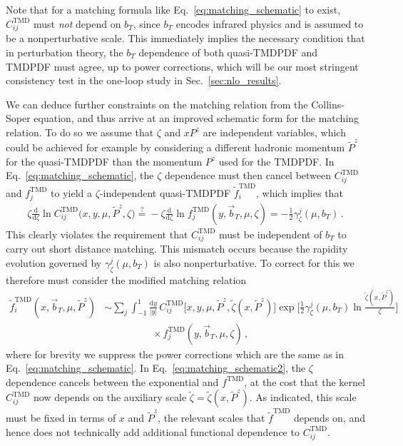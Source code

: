 \documentclass[11pt,a4paper]{article}
\DeclareRobustCommand{\eq}[1]{Eq.~\eqref{eq:#1}}
\DeclareRobustCommand{\sec}[1]{Sec.~\ref{sec:#1}}
\newcommand{\df}{\mathrm{d}}
\newcommand{\nn}{\nonumber}
\newcommand\TMD{\mathrm{TMD}}
\newcommand{\bt}{\vec b_T}
\begin{document}
Note that for a matching formula like \eq{matching_schematic} to exist, $C^\TMD_{ij}$ must \emph{not} depend on $b_T$, since $b_T$ encodes infrared physics and is assumed to be a nonperturbative scale.
This immediately implies the necessary condition that in perturbation theory,
the $b_T$ dependence of both quasi-TMDPDF and TMDPDF must agree, up to power corrections,
which will be our most stringent consistency test in the one-loop study in \sec{nlo_results}.

We can deduce further constraints on the matching relation from the Collins-Soper equation, and thus arrive at an improved schematic form for the matching relation. To do so we assume that $\zeta$ and $x P^z$ are independent variables, which could be achieved for example by considering a different hadronic momentum $\tilde P^z$ for the quasi-TMDPDF than the momentum $P^z$ used for the  TMDPDF.
In \eq{matching_schematic}, the $\zeta$ dependence must then cancel between $C^\TMD_{ij}$ and $f_j^\TMD$
to yield a $\zeta$-independent quasi-TMDPDF $\tilde f_i^\TMD$, which implies that
\begin{align}
\zeta \frac{\df}{\df \zeta} \ln C^\TMD_{ij}\bigl(x, y, \mu, \tilde P^z, \zeta \bigr)
\stackrel{?}{=} -\zeta \frac{\df}{\df \zeta} \ln f^\TMD_{j}(y, \bt, \mu, \zeta)
=-\frac12 \gamma_\zeta^j(\mu,b_T)
\,.\end{align}
This clearly violates the requirement that $C^\TMD_{ij}$ must be independent of $b_T$ to carry out short distance matching. 
This mismatch occurs because the rapidity evolution governed by $\gamma_\zeta^j(\mu,b_T)$ is also nonperturbative. To correct for this we therefore must consider the modified matching relation
\begin{align} \label{eq:matching_schematic2}
\tilde f_{i}^\TMD(x, \bt, \mu, \tilde P^z) &
\sim \sum_j \int_{-1}^1 \frac{\df y}{|y|} \, C^\TMD_{ij}\bigl[x, y, \mu, \tilde P^z, \tilde \zeta(x,\tilde P^z)\bigr]
\exp\biggl[\frac12 \gamma_\zeta^j(\mu,b_T) \ln\frac{\tilde \zeta(x,\tilde P^z)}{\zeta} \biggr]
\nn\\&\hspace{2cm}\times
f^\TMD_{j}(y, \bt, \mu, \zeta)
\,,\end{align}
where for brevity we suppress the power corrections which are the same as in \eq{matching_schematic}.
In \eq{matching_schematic2}, the $\zeta$ dependence cancels between the exponential and $f^\TMD$,
at the cost that the kernel $C_{ij}^\TMD$ now depends on the auxiliary scale $\tilde \zeta = \tilde \zeta(x, \tilde P^z)$.
As indicated, this scale must be fixed in terms of $x$ and $\tilde P^z$, the relevant scales that $\tilde f^\TMD$ depends on, and hence does not technically add additional functional dependence to $C_{ij}^\TMD$.  
\end{document}
